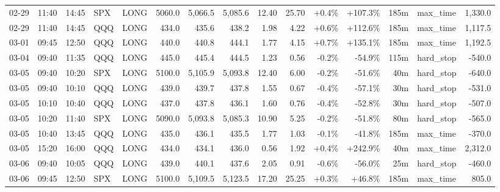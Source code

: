 \documentclass[11pt,a4paper,twoside]{article}
\begin{document}
\begin{landscape}
\begin{center}
\begin{longtable}{>{\color{txtmain}}l l l l l r r r r r r r r >{\color{txtmain}}l r}
02-29 & 11:40 & 14:45 & SPX & LONG & 5060.0 & 5,066.5 & 5,085.6 & 12.40 & 25.70 & \textcolor{wingreen}{+0.4\%} & \textcolor{wingreen}{+107.3\%} & 185m & max\_time & \textcolor{wingreen}{1,330.0} \\
02-29 & 11:40 & 14:45 & QQQ & LONG & 434.0 & 435.6 & 438.2 & 1.98 & 4.22 & \textcolor{wingreen}{+0.6\%} & \textcolor{wingreen}{+112.6\%} & 185m & max\_time & \textcolor{wingreen}{1,117.5} \\
03-01 & 09:45 & 12:50 & QQQ & LONG & 440.0 & 440.8 & 444.1 & 1.77 & 4.15 & \textcolor{wingreen}{+0.7\%} & \textcolor{wingreen}{+135.1\%} & 185m & max\_time & \textcolor{wingreen}{1,192.5} \\
03-04 & 09:40 & 11:35 & QQQ & LONG & 445.0 & 445.4 & 444.5 & 1.23 & 0.56 & \textcolor{lossred}{-0.2\%} & \textcolor{lossred}{-54.9\%} & 115m & hard\_stop & \textcolor{lossred}{-540.0} \\
03-05 & 09:40 & 10:20 & SPX & LONG & 5100.0 & 5,105.9 & 5,093.8 & 12.40 & 6.00 & \textcolor{lossred}{-0.2\%} & \textcolor{lossred}{-51.6\%} & 40m & hard\_stop & \textcolor{lossred}{-640.0} \\
03-05 & 09:40 & 10:10 & QQQ & LONG & 439.0 & 439.7 & 437.8 & 1.55 & 0.67 & \textcolor{lossred}{-0.4\%} & \textcolor{lossred}{-57.1\%} & 30m & hard\_stop & \textcolor{lossred}{-531.0} \\
03-05 & 10:10 & 10:40 & QQQ & LONG & 437.0 & 437.8 & 436.1 & 1.60 & 0.76 & \textcolor{lossred}{-0.4\%} & \textcolor{lossred}{-52.8\%} & 30m & hard\_stop & \textcolor{lossred}{-507.0} \\
03-05 & 10:20 & 11:40 & SPX & LONG & 5090.0 & 5,093.8 & 5,085.3 & 10.90 & 5.25 & \textcolor{lossred}{-0.2\%} & \textcolor{lossred}{-51.8\%} & 80m & hard\_stop & \textcolor{lossred}{-565.0} \\
03-05 & 10:40 & 13:45 & QQQ & LONG & 435.0 & 436.1 & 435.5 & 1.77 & 1.03 & \textcolor{lossred}{-0.1\%} & \textcolor{lossred}{-41.8\%} & 185m & max\_time & \textcolor{lossred}{-370.0} \\
03-05 & 15:20 & 16:00 & QQQ & LONG & 434.0 & 434.1 & 436.0 & 0.56 & 1.92 & \textcolor{wingreen}{+0.4\%} & \textcolor{wingreen}{+242.9\%} & 40m & max\_time & \textcolor{wingreen}{2,312.0} \\
03-06 & 09:40 & 10:05 & QQQ & LONG & 439.0 & 440.1 & 437.6 & 2.05 & 0.91 & \textcolor{lossred}{-0.6\%} & \textcolor{lossred}{-56.0\%} & 25m & hard\_stop & \textcolor{lossred}{-460.0} \\
03-06 & 09:45 & 12:50 & SPX & LONG & 5100.0 & 5,109.5 & 5,123.5 & 17.20 & 25.25 & \textcolor{wingreen}{+0.3\%} & \textcolor{wingreen}{+46.8\%} & 185m & max\_time & \textcolor{wingreen}{805.0} \\

\end{longtable}
\end{center}
\end{landscape}
\end{document}
